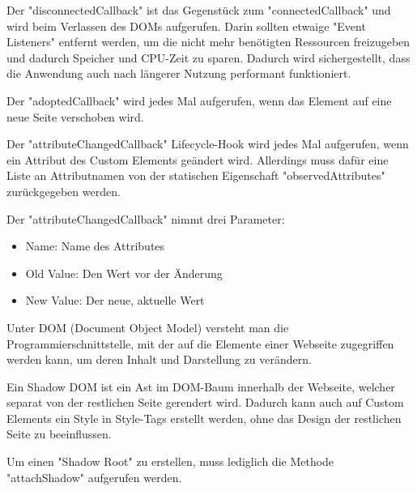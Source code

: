    
Der "{\ttfamily disconnectedCallback}" ist das Gegenstück zum "{\ttfamily connectedCallback}" und wird beim Verlassen des DOMs aufgerufen. Darin sollten etwaige "Event Listeners" entfernt werden, um die nicht mehr benötigten Ressourcen freizugeben und dadurch Speicher und CPU-Zeit zu sparen. 
Dadurch wird sichergestellt, dass die Anwendung auch nach längerer Nutzung performant funktioniert.


Der "{\ttfamily adoptedCallback}" wird jedes Mal aufgerufen, wenn das Element auf eine neue Seite verschoben wird.


Der "{\ttfamily attributeChangedCallback}" Lifecycle-Hook wird jedes Mal aufgerufen, wenn ein Attribut des Custom Elements geändert wird. Allerdings muss dafür eine Liste an Attributnamen von der statischen Eigenschaft "{\ttfamily observedAttributes}" zurückgegeben werden. 
    
Der "{\ttfamily attributeChangedCallback}" nimmt drei Parameter:
\begin{itemize}
    \item Name: Name des Attributes
    \item Old Value: Den Wert vor der Änderung
    \item New Value: Der neue, aktuelle Wert 
\end{itemize}


\pagebreak
{}

Unter DOM (Document Object Model) versteht man die Programmierschnittstelle, mit der auf die Elemente einer Webseite zugegriffen werden kann, um deren Inhalt und Darstellung zu verändern. \cite{MDNDOM}

Ein Shadow DOM ist ein Ast im DOM-Baum innerhalb der Webseite, welcher separat von der restlichen Seite gerendert wird. Dadurch kann auch auf Custom Elements ein Style in Style-Tags erstellt werden, ohne das Design der restlichen Seite zu beeinflussen. \cite{MDNShadowRoot}

Um einen "Shadow Root" zu erstellen, muss lediglich die Methode "{\ttfamily attachShadow}" aufgerufen werden. \cite{MDNShadowRoot}


